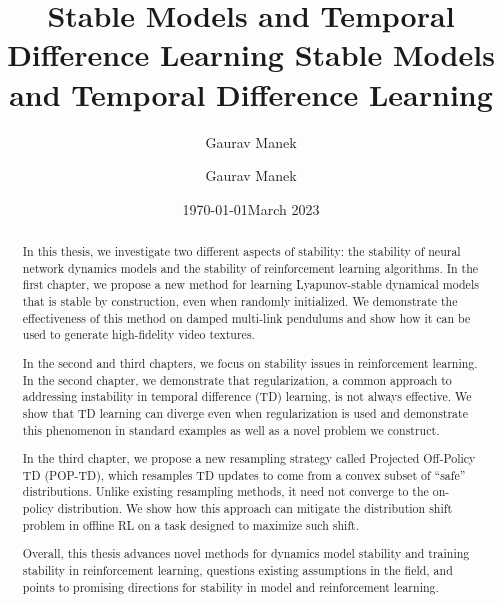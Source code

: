 \documentclass[12pt]{cmuthesis}
\title{ Stable Models and Temporal Difference Learning }
\author{ Gaurav Manek }
\date{\today}
\begin{document}

\frontmatter
\pagestyle{empty}

\title{
	{\bf Stable Models and Temporal Difference Learning }}
\author{Gaurav Manek}
\date{March 2023}



\maketitle

\cleardoublepage
\restoregeometry
\pagestyle{plain} %


\begin{abstract}
	In this thesis, we investigate two different aspects of stability: the stability of neural network dynamics models and the stability of reinforcement learning algorithms. In the first chapter, we propose a new method for learning Lyapunov-stable dynamical models that is stable by construction, even when randomly initialized. We demonstrate the effectiveness of this method on damped multi-link pendulums and show how it can be used to generate high-fidelity video textures.

	In the second and third chapters, we focus on stability issues in reinforcement learning. In the second chapter, we demonstrate that regularization, a common approach to addressing instability in temporal difference (TD) learning, is not always effective. We show that TD learning can diverge even when regularization is used and demonstrate this phenomenon in standard examples as well as a novel problem we construct.

	In the third chapter, we propose a new resampling strategy called Projected Off-Policy TD (POP-TD), which resamples TD updates to come from a convex subset of ``safe'' distributions. Unlike existing resampling methods, it need not converge to the on-policy distribution. We show how this approach can mitigate the distribution shift problem in offline RL on a task designed to maximize such shift.

	Overall, this thesis advances novel methods for dynamics model stability and training stability in reinforcement learning, questions existing assumptions in the field, and points to promising directions for stability in model and reinforcement learning.
\end{abstract}
\end{document}

